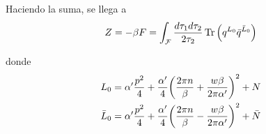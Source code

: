 Haciendo la suma, se llega a
\begin{equation}
  Z=-\beta F=\int_{\mathcal F}\frac{d\tau_1d\tau_2}{2\tau_2}\Tr\qty(q^{L_0}\bar q^{\bar L_0})
\end{equation}

donde
\begin{align}
  L_0&=\alpha'\frac{p^2}{4}+\frac{\alpha'}{4}\qty(\frac{2\pi n}{\beta}+\frac{w\beta}{2\pi\alpha'})^2+N\\ 
 \bar L_0&=\alpha'\frac{p^2}{4}+\frac{\alpha'}{4}\qty(\frac{2\pi n}{\beta}-\frac{w\beta}{2\pi\alpha'})^2+\bar N
\end{align}


%
